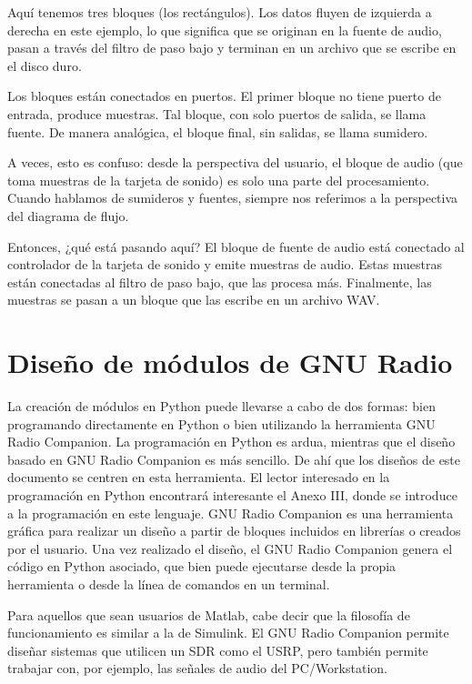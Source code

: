 Aquí tenemos tres bloques (los rectángulos). Los datos fluyen de izquierda a derecha en este ejemplo, lo que significa que se originan en la fuente de audio, pasan a través del filtro de paso bajo y terminan en un archivo que se escribe en el disco duro.



Los bloques están conectados en puertos. El primer bloque no tiene puerto de entrada, produce muestras. Tal bloque, con solo puertos de salida, se llama fuente. De manera analógica, el bloque final, sin salidas, se llama sumidero.

A veces, esto es confuso: desde la perspectiva del usuario, el bloque de audio (que toma muestras de la tarjeta de sonido) es solo una parte del procesamiento. Cuando hablamos de sumideros y fuentes, siempre nos referimos a la perspectiva del diagrama de flujo.

Entonces, ¿qué está pasando aquí? El bloque de fuente de audio está conectado al controlador de la tarjeta de sonido y emite muestras de audio. Estas muestras están conectadas al filtro de paso bajo, que las procesa más. Finalmente, las muestras se pasan a un bloque que las escribe en un archivo WAV.

\section{Diseño de módulos de GNU Radio}

La creación de módulos en Python puede llevarse a cabo de dos formas: bien programando
directamente en Python o bien utilizando la herramienta GNU Radio Companion. La
programación en Python es ardua, mientras que el diseño basado en GNU Radio Companion es
más sencillo. De ahí que los diseños de este documento se centren en esta herramienta. El lector interesado en la programación en Python encontrará interesante el Anexo III, donde se introduce a la programación en este lenguaje. GNU Radio Companion es una herramienta gráfica para realizar un diseño a partir de bloques incluidos en librerías o creados por el usuario. Una vez realizado el diseño, el GNU Radio Companion genera el código en Python asociado, que
bien puede ejecutarse desde la propia herramienta o desde la línea de comandos en un terminal.

Para aquellos que sean usuarios de Matlab, cabe decir que la filosofía de funcionamiento es
similar a la de Simulink. El GNU Radio Companion permite diseñar sistemas que utilicen un SDR como el USRP, pero también permite trabajar con, por ejemplo, las señales de audio del PC/Workstation.

